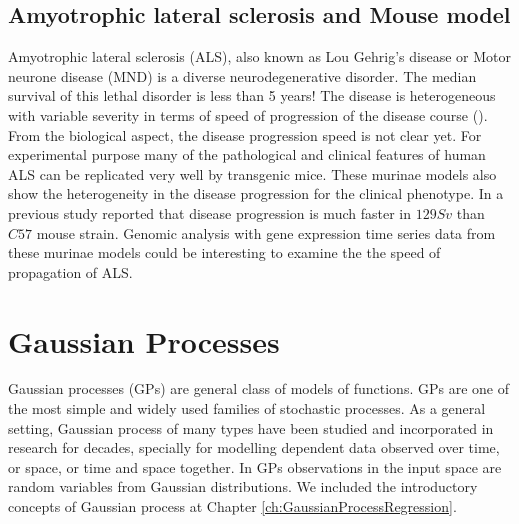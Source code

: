 \subsection{Amyotrophic lateral sclerosis and Mouse model}
Amyotrophic lateral sclerosis (ALS), also known as Lou Gehrig's disease or Motor neurone disease (MND) is a diverse neurodegenerative disorder. The median survival of this lethal disorder is less than 5 years! The disease is heterogeneous with variable severity in terms of speed of progression of the disease course (\cite{Brockington:2013, Peviani:2010}). From the biological aspect, the disease progression speed is not clear yet. For experimental purpose many of the pathological and clinical features of human ALS can be replicated very well by transgenic mice. These murinae models also show the heterogeneity in the disease progression for the clinical phenotype. In a previous study \cite{Pizzasegola:2009} reported that disease progression is much faster in $129Sv$ than $C57$ mouse strain. Genomic analysis with gene expression time series data from these murinae models could be interesting to examine the the speed of propagation of ALS.

\section{Gaussian Processes}
Gaussian processes (GPs) are general class of models of functions. GPs are one of the most simple and widely used families of stochastic processes. As a general setting, Gaussian process of many types have been studied and incorporated in research for decades, specially for modelling dependent data observed over time, or space, or time and space together. In GPs observations in the input space are random variables from Gaussian distributions. We included the introductory concepts of Gaussian process at Chapter \ref{ch:GaussianProcessRegression}.

% 
% 

